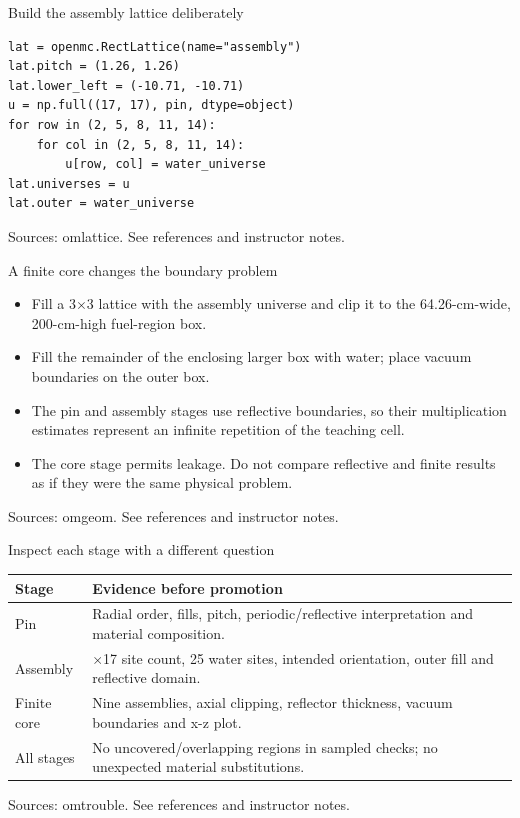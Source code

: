 \documentclass[aspectratio=169,11pt]{beamer}
\begin{document}
\begin{frame}[t,fragile]{Build the assembly lattice deliberately}
\begin{lstlisting}
lat = openmc.RectLattice(name="assembly")
lat.pitch = (1.26, 1.26)
lat.lower_left = (-10.71, -10.71)
u = np.full((17, 17), pin, dtype=object)
for row in (2, 5, 8, 11, 14):
    for col in (2, 5, 8, 11, 14):
        u[row, col] = water_universe
lat.universes = u
lat.outer = water_universe
\end{lstlisting}
\vfill{\fontsize{6.5}{8}\selectfont\color{UTgray} Sources: omlattice. See references and instructor notes.\par}
\end{frame}
\begin{frame}[t,fragile]{A finite core changes the boundary problem}
\fontsize{11.5}{14}\selectfont
\begin{itemize}\setlength{\itemsep}{2mm}
\item Fill a 3$\times$3 lattice with the assembly universe and clip it to the 64.26-cm-wide, 200-cm-high fuel-region box.
\item Fill the remainder of the enclosing larger box with water; place vacuum boundaries on the outer box.
\item The pin and assembly stages use reflective boundaries, so their multiplication estimates represent an infinite repetition of the teaching cell.
\item The core stage permits leakage. Do not compare reflective and finite results as if they were the same physical problem.
\end{itemize}
\vfill{\fontsize{6.5}{8}\selectfont\color{UTgray} Sources: omgeom. See references and instructor notes.\par}
\end{frame}
\begin{frame}[t,fragile]{Inspect each stage with a different question}
\fontsize{10.5}{12.5}\selectfont\setlength{\tabcolsep}{4pt}\renewcommand{\arraystretch}{1.15}
\begin{tabular}{>{\raggedright\arraybackslash}p{}>{\raggedright\arraybackslash}p{}}
\toprule
\textbf{Stage} & \textbf{Evidence before promotion} \\ \midrule
Pin & Radial order, fills, pitch, periodic/reflective interpretation and material composition. \\[2pt]
Assembly & 17$\times$17 site count, 25 water sites, intended orientation, outer fill and reflective domain. \\[2pt]
Finite core & Nine assemblies, axial clipping, reflector thickness, vacuum boundaries and x-z plot. \\[2pt]
All stages & No uncovered/overlapping regions in sampled checks; no unexpected material substitutions. \\[2pt]
\bottomrule\end{tabular}\par\vspace{2mm}
\vfill{\fontsize{6.5}{8}\selectfont\color{UTgray} Sources: omtrouble. See references and instructor notes.\par}
\end{frame}
\end{document}
